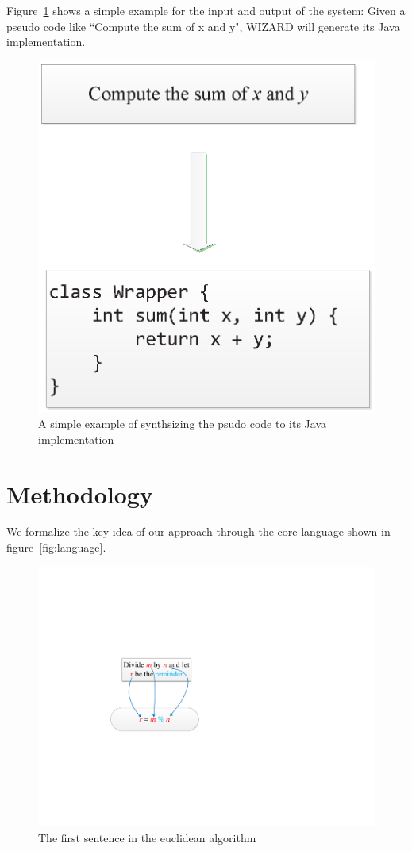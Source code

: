 \documentclass[11pt]{article}
\begin{document}
 Figure~\ref{fig:convert} shows a 
 simple example for the input and output of the system: Given a pseudo code like 
 ``Compute the sum of x and y", WIZARD will generate its Java implementation.

  
\begin{figure}
\centering
\includegraphics[scale=0.5]{figure/figure1.eps}
\caption{A simple example of synthsizing the psudo code to its Java implementation}\label{fig:convert}
\end{figure}


\section{Methodology}
We formalize the key idea of our approach through the core language shown in
figure~\ref{fig:language}. 
 
 \begin{figure}
\centering
\includegraphics[scale=0.7]{figure/figure2.pdf}
\caption{The first sentence in the euclidean algorithm}\label{fig:align}
\end{figure}
\end{document}
